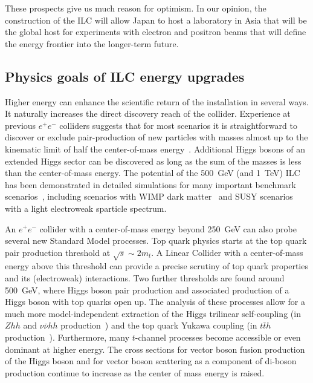 These prospects give us much reason for optimism. In our opinion, the
 construction
of the ILC will allow Japan to host a laboratory
in Asia that will be the global host for experiments with electron
and positron beams that will define the energy frontier into the longer-term future.



\subsection{Physics goals of ILC energy upgrades}
\label{subsec:highE:physics}

Higher energy can enhance the scientific return of the installation in several
ways. It naturally increases the direct discovery reach of the collider. Experience at
previous $e^+e^-$ colliders suggests that for most scenarios it is straightforward to
discover or exclude pair-production of new particles with masses almost up to the
kinematic limit of half the center-of-mass energy~\cite{Fujii:2017ekh}. Additional
Higgs bosons of an extended Higgs sector can be discovered as long as the sum of
the masses is less than the center-of-mass energy. The potential
of the 500~GeV (and 1~TeV) ILC has been demonstrated in detailed simulations
for many important benchmark scenarios~\cite{Fujii:2015jha,Baer:2013cma}, including
scenarios with WIMP dark matter~\cite{Bartels:2012ex} and SUSY scenarios with
a light electroweak sparticle spectrum\cite{Berggren:2013vfa}.

An $e^+e^-$ collider with a center-of-mass energy beyond 250~GeV can also
probe several new Standard Model processes.
Top quark physics starts at the top quark pair production threshold at
$\sqrt{s}\sim 2 m_t$. A Linear Collider with a center-of-mass energy
above this threshold can provide a precise scrutiny of top quark
properties and its (electroweak) interactions.
Two further thresholds are found around 500~GeV, where Higgs boson pair production
and associated production of a Higgs boson with top quarks open up.
The analysis of these processes allow for a much more model-independent
extraction of the Higgs trilinear self-coupling (in $Zhh$ and $\nu \bar{\nu}hh$
production~\cite{Barklow:2017awn}) and the top quark Yukawa
coupling (in $t\bar{t}h$ production~\cite{Yonamine:2011jg}). 
Furthermore, many $t$-channel processes become accessible or even dominant
at higher energy. The cross sections for vector boson fusion production
of the Higgs boson and for vector boson scattering as a component of
di-boson production continue to increase as the center of mass energy
is raised.

